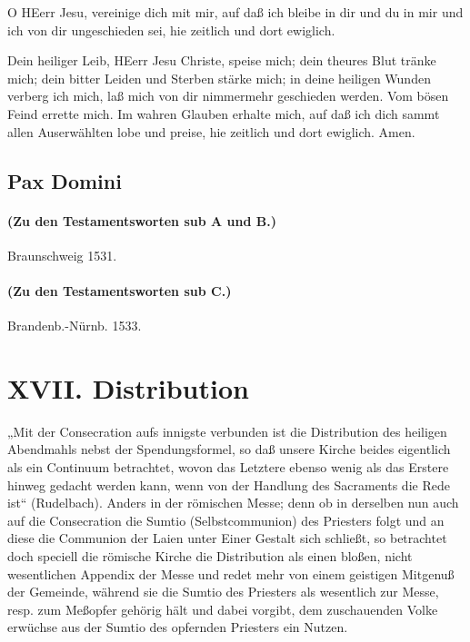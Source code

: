 O HEerr Jesu, vereinige dich mit mir, auf daß ich bleibe in dir und du in mir und ich von dir ungeschieden sei, hie zeitlich und dort ewiglich.

Dein heiliger Leib, HEerr Jesu Christe, speise mich; dein theures Blut tränke mich; dein bitter Leiden und Sterben stärke mich; in deine heiligen Wunden verberg ich mich, laß mich von dir nimmermehr geschieden werden. Vom bösen Feind errette mich. Im wahren Glauben erhalte mich, auf daß ich dich sammt allen Auserwählten lobe und preise, hie zeitlich und dort ewiglich. Amen.

\section{Pax Domini}

\subsubsection{(Zu den Testamentsworten sub A und B.)}

Braunschweig 1531.



\subsubsection{(Zu den Testamentsworten sub C.)}

Brandenb.-Nürnb. 1533.




\chapter{XVII. Distribution}


„Mit der Consecration aufs innigste verbunden ist die Distribution des heiligen Abendmahls nebst der Spendungsformel, so daß unsere Kirche beides eigentlich als ein Continuum betrachtet, wovon das Letztere ebenso wenig als das Erstere hinweg gedacht werden kann, wenn von der Handlung des Sacraments die Rede ist“ (Rudelbach). Anders in der römischen Messe; denn ob in derselben nun auch auf die Consecration die Sumtio (Selbstcommunion) des Priesters folgt und an diese die Communion der Laien unter Einer Gestalt sich schließt, so betrachtet doch speciell die römische Kirche die Distribution als einen bloßen, nicht wesentlichen Appendix der Messe und redet mehr von einem geistigen Mitgenuß der Gemeinde, während sie die Sumtio des Priesters als wesentlich zur Messe, resp. zum Meßopfer gehörig hält und dabei vorgibt, dem zuschauenden Volke erwüchse aus der Sumtio des opfernden Priesters ein Nutzen.

